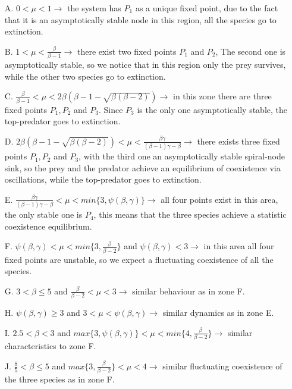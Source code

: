 \documentclass[10pt]{Configuration_Files/PoliMi3i_thesis}
\begin{document}
\begin{itemize}
\item[A.] $0 < \mu < 1 \to $ the system has  $P_1$ as a unique fixed point, due to the fact that it is an asymptotically stable node in this region, all the species go to extinction.
\item[B.] $1 < \mu < \frac{\beta}{\beta-1} \to$ there exist two fixed points $P_1$ and $P_2$, The second one is asymptotically stable, so we notice that in this region only the prey survives, while the other two species go to extinction.
\item[C.] $ \frac{\beta}{\beta-1} < \mu < 2 \beta (\beta -1 - \sqrt{\beta(\beta -2)}) \to$ in this zone there are three fixed points $P_1, P_2$ and $P_3$. Since $P_3$ is the only one asymptotically stable, the top-predator goes to extinction.
\item[D.] $ 2 \beta (\beta -1 - \sqrt{\beta(\beta -2)}) < \mu <  \frac{\beta \gamma}{(\beta-1)\gamma-\beta} \to$ there exists three fixed points $P_1, P_2$ and $P_3$, with the third one an asymptotically stable spiral-node sink, so the prey and the predator achieve an equilibrium of coexistence via oscillations, while the top-predator goes to extinction.
\item[E.] $\frac{\beta \gamma}{(\beta-1)\gamma-\beta} < \mu < min\{3,\psi (\beta,\gamma)\} \to$ all four points exist in this area, the only stable one is $P_4$, this means that the three species achieve a statistic coexistence equilibrium.
\item[F.] $\psi (\beta,\gamma) < \mu < min\{3,\frac{\beta}{\beta-2}\}$ and $\psi (\beta,\gamma) < 3 \to$ in this area all four fixed points are unstable, so we expect a fluctuating coexistence of all the species.
\item[G.] $3 < \beta \le 5$ and $\frac{\beta}{\beta-2} < \mu < 3 \to$ similar behaviour as in zone F.
\item[H.] $\psi (\beta,\gamma) \ge 3$ and $ 3 < \mu < \psi  (\beta,\gamma) \to$ similar dynamics as in zone E.
\item[I.] $2.5 < \beta < 3$ and $max\{3,\psi (\beta,\gamma)\} < \mu < min\{4,\frac{\beta}{\beta-2}\} \to$ similar characteristics to zone F.
\item[J.] $\frac{8}{5} < \beta \le 5$ and $max\{3,\frac{\beta}{\beta-2}\} < \mu < 4 \to$ similar fluctuating coexistence of the three species as in zone F.
\end{itemize}
\end{document}
